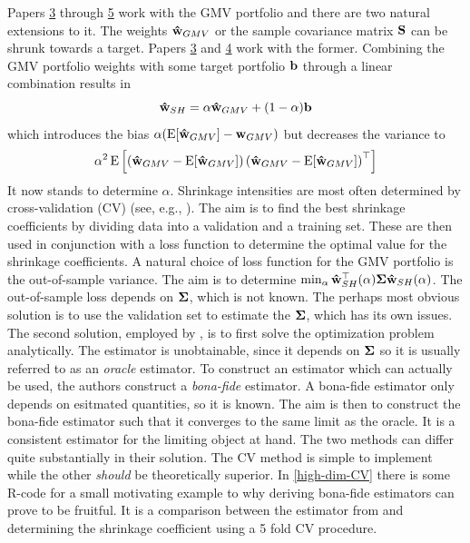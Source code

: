 \documentclass[12pt, oneside]{book}\usepackage{knitr}
\begin{document}
{Papers \hyperref[sec:paper3]{3} through \hyperref[sec:paper4]{5} work with the GMV portfolio and there are two natural extensions to it. 
The weights $\mathbf{\hat{w}}_{GMV}$ or the sample covariance matrix $\mathbf{S}$ can be shrunk towards a target. 
Papers \hyperref[sec:paper3]{3} and \hyperref[sec:paper4]{4} work with the former.
Combining the GMV portfolio weights with some target portfolio $\mathbf{b}$ through a linear combination results in
\begin{equation*}\label{eqn:linshrink}
  \mathbf{\hat{w}}_{SH} = \alpha\mathbf{\hat{w}}_{GMV} + (1-\alpha)\mathbf{b}
\end{equation*}
which introduces the bias $\alpha(\operatorname{E}[\mathbf{\hat{w}}_{GMV}] - \mathbf{w}_{GMV})$ but decreases the variance to
\begin{align*}
  \alpha^2\operatorname{E}\left[\left(\mathbf{\hat{w}}_{GMV} - \operatorname{E}[\mathbf{\hat{w}}_{GMV}]\right)\left(\mathbf{\hat{w}}_{GMV} - \operatorname{E}[\mathbf{\hat{w}}_{GMV}]\right)^\top\right]
\end{align*}
It now stands to determine $\alpha$. 
Shrinkage intensities are most often determined by cross-validation (CV) (see, e.g., \citet[ch. 5]{james2013introduction}). 
The aim is to find the best shrinkage coefficients by dividing data into a validation and a training set.
These are then used in conjunction with a loss function to determine the optimal value for the shrinkage coefficients.
A natural choice of loss function for the GMV portfolio is the out-of-sample variance.
The aim is to determine $\min_\alpha \mathbf{\hat{w}}_{SH}^\top(\alpha) \mathbf{\Sigma} \mathbf{\hat{w}}_{SH}(\alpha)$.
The out-of-sample loss depends on $\mathbf{\Sigma}$, which is not known.
The perhaps most obvious solution is to use the validation set to estimate the $\mathbf{\Sigma}$, which has its own issues.
The second solution, employed by \citet{bodnar2018estimation}, is to first solve the optimization problem analytically.
The estimator is unobtainable, since it depends on $\mathbf{\Sigma}$ so it is usually referred to as an \textit{oracle} estimator. 
To construct an estimator which can actually be used, the authors construct a \textit{bona-fide} estimator.
A bona-fide estimator only depends on esitmated quantities, so it is known.
The aim is then to construct the bona-fide estimator such that it converges to the same limit as the oracle. 
It is a consistent estimator for the limiting object at hand.
The two methods can differ quite substantially in their solution. 
The CV method is simple to implement while the other \textit{should} be theoretically superior.
In \ref{high-dim-CV} there is some R-code for a small motivating example to why deriving bona-fide estimators can prove to be fruitful.
It is a comparison between the estimator from \citet{bodnar2018estimation} and determining the shrinkage coefficient using a 5 fold CV procedure.
}
\end{document}
